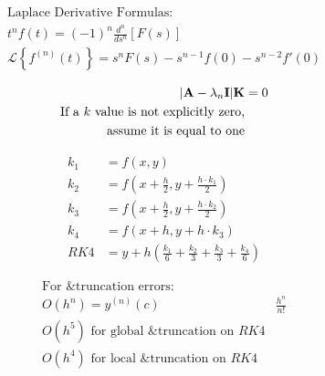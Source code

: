 \documentclass[12pt]{article}
\begin{document}
\begin{multicols}{2}

  \begin{equation*}
    \begin{split}
      \text{Laplace Derivative Formulas:}\\
      t^nf(t)=(-1)^n\frac{d^n}{ds^n}[F(s)]\\
      \mathcal{L}\left\{ f^{(n)}(t) \right\}=s^nF(s)-s^{n-1}f(0)-s^{n-2}f'(0)
    \end{split}
    \label{5}
  \end{equation*}

  \begin{equation*}
    \begin{split}
      |\bold{A}-\lambda_n\bold{I}|\bold{K}&=0\\
      \text{If a }k\text{ value is not explicitly zero,}\\
      \text{assume it is equal to one}
    \end{split}
    \label{6}
  \end{equation*}

\end{multicols}

\begin{multicols}{2}

  \begin{equation*}
    \begin{split}
      k_1&=f\left(x,y\right)\\
      k_2&=f\left(x+\frac{h}{2},y+\frac{h\cdot k_1}{2}\right)\\
      k_3&=f\left(x+\frac{h}{2},y+\frac{h\cdot k_2}{2}\right)\\
      k_4&=f\left(x+h,y+h\cdot k_3\right)\\
      RK4&=y+h\left( \frac{k_1}{6}+\frac{k_2}{3}+\frac{k_3}{3}+\frac{k_4}{6} \right)
    \end{split}
    \label{7}
  \end{equation*}

  \begin{equation*}
    \begin{split}
      \text{For &truncation errors:}\\
      O(h^n)=y^{(n)}\left( c \right)&\frac{h^n}{n!}\\
      O(h^5)\text{ for global &truncation on } RK4\\
      O(h^4)\text{ for local &truncation on } RK4\\
    \end{split}
    \label{8}
  \end{equation*}


\end{multicols}
\end{document}
